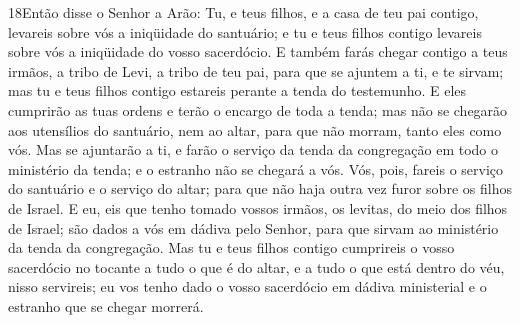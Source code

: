 \medskip

\lettrine{18} Então disse o Senhor a Arão: Tu, e teus filhos,
e a casa de teu pai contigo, levareis sobre vós a iniqüidade do
santuário; e tu e teus filhos contigo levareis sobre vós a
iniqüidade do vosso sacerdócio. E também farás chegar contigo a
teus irmãos, a tribo de Levi, a tribo de teu pai, para que se
ajuntem a ti, e te sirvam; mas tu e teus filhos contigo estareis
perante a tenda do testemunho. E eles cumprirão as tuas ordens e
terão o encargo de toda a tenda; mas não se chegarão aos utensílios
do santuário, nem ao altar, para que não morram, tanto eles como
vós. Mas se ajuntarão a ti, e farão o serviço da tenda da
congregação em todo o ministério da tenda; e o estranho não se
chegará a vós. Vós, pois, fareis o serviço do santuário e o
serviço do altar; para que não haja outra vez furor sobre os filhos
de Israel. E eu, eis que tenho tomado vossos irmãos, os levitas,
do meio dos filhos de Israel; são dados a vós em dádiva pelo Senhor,
para que sirvam ao ministério da tenda da congregação. Mas tu e
teus filhos contigo cumprireis o vosso sacerdócio no tocante a tudo
o que é do altar, e a tudo o que está dentro do véu, nisso
servireis; eu vos tenho dado o vosso sacerdócio em dádiva
ministerial e o estranho que se chegar morrerá.

